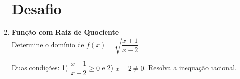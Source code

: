 \documentclass[11pt]{article}
\begin{document}
\begin{multicols}{2}
\begin{enumerate}
\section*{Desafio}

\item \textbf{Função com Raiz de Quociente}\\
Determine o domínio de $f(x) = \sqrt{\dfrac{x+1}{x-2}}$
\begin{tcolorbox}[colback=explanationbg,colframe=titleblue,title=Dica:]
Duas condições: 1) $\dfrac{x+1}{x-2} \geq 0$ e 2) $x-2 \neq 0$. Resolva a inequação racional.
\end{tcolorbox}


\end{enumerate}
\end{multicols}
\end{document}

